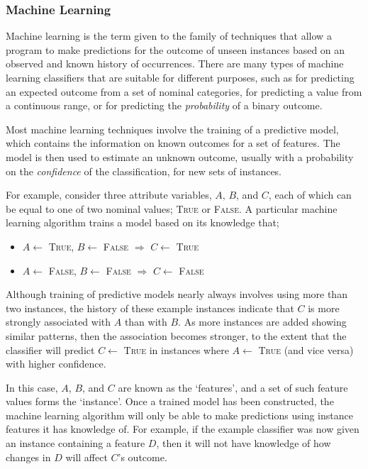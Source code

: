 \subsubsection{Machine Learning}
Machine learning is the term given to the family of techniques that allow a program to make predictions for the outcome of unseen instances based on an observed and known history of occurrences. There are many types of machine learning classifiers that are suitable for different purposes, such as for predicting an expected outcome from a set of nominal categories, for predicting a value from a continuous range, or for predicting the \textit{probability} of a binary outcome.

Most machine learning techniques involve the training of a predictive model, which contains the information on known outcomes for a set of features. The model is then used to estimate an unknown outcome, usually with a probability on the \textit{confidence} of the classification, for new sets of instances.

For example, consider three attribute variables, $A$, $B$, and $C$, each of which can be equal to one of two nominal values; \textsc{True} or \textsc{False}. A particular machine learning algorithm trains a model based on its knowledge that;
\begin{itemize}
    \item $A\gets$ \textsc{True}, $B\gets$ \textsc{False} $\Longrightarrow$ $C\gets$ \textsc{True}
    \item $A\gets$ \textsc{False}, $B\gets$ \textsc{False} $\Longrightarrow$ $C\gets$ \textsc{False}
\end{itemize}
Although training of predictive models nearly always involves using more than two instances, the history of these example instances indicate that $C$ is more strongly associated with $A$ than with $B$. As more instances are added showing similar patterns, then the association becomes stronger, to the extent that the classifier will predict $C\gets$ \textsc{True} in instances where $A\gets$ \textsc{True} (and vice versa) with higher confidence.

In this case, $A$, $B$, and $C$ are known as the `features', and a set of such feature values forms the `instance'. Once a trained model has been constructed, the machine learning algorithm will only be able to make predictions using instance features it has knowledge of. For example, if the example classifier was now given an instance containing a feature $D$, then it will not have knowledge of how changes in $D$ will affect $C$'s outcome.

